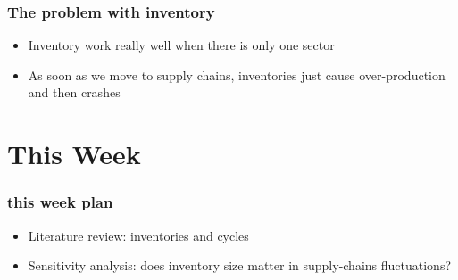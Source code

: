 \documentclass[a4paper,12pt,english]{beamer}
\begin{document}
\begin{frame}
\frametitle{The problem with inventory}
\begin{itemize}
\item Inventory work really well when there is only one sector
\pause
\item As soon as we move to supply chains, inventories just cause over-production and then crashes
\end{itemize}
\end{frame}

\section{This Week}

\begin{frame}
\frametitle{this week plan}
\begin{itemize}
\item Literature review: inventories and cycles
\pause
\item Sensitivity analysis: does inventory size matter in supply-chains fluctuations?
\end{itemize}
\end{frame}
\end{document}
